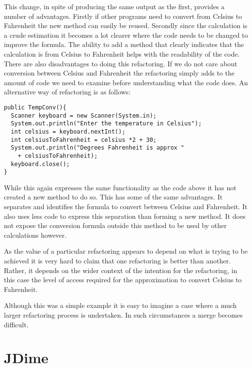 This change, in spite of producing the same output as the first, provides a number of advantages. Firstly if other programs need to convert from Celsius to Fahrenheit the new method can easily be reused. Secondly since the calculation is a crude estimation it becomes a lot clearer where the code needs to be changed to improve the formula. The ability to add a method that clearly indicates that the calculation is from Celsius to Fahrenheit helps with the readability of the code. There are also disadvantages to doing this refactoring. If we do not care about conversion between Celsius and Fahrenheit the refactoring simply adds to the amount of code we need to examine before understanding what the code does. An alternative way of refactoring is as follows:

\begin{minipage}[t]{1.0\textwidth}
\begin{lstlisting}
public TempConv(){
  Scanner keyboard = new Scanner(System.in);
  System.out.println("Enter the temperature in Celsius");
  int celsius = keyboard.nextInt();
  int celsiusToFahrenheit = celsius *2 + 30;
  System.out.println("Degrees Fahrenheit is approx " 
    + celsiusToFahrenheit);
  keyboard.close();
}
\end{lstlisting}
\end{minipage}

While this again expresses the same functionality as the code above it has not created a new method to do so. This has some of the same advantages. It separates and identifies the formula to convert between Celsius and Fahrenheit. It also uses less code to express this separation than forming a new method. It does not expose the conversion formula outside this method to be used by other calculations however.

As the value of a particular refactoring appears to depend on what is trying to be achieved it is very hard to claim that one refactoring is better than another. Rather, it depends on the wider context of the intention for the refactoring, in this case the level of access required for the approximation to convert Celsius to Fahrenheit.

Although this was a simple example it is easy to imagine a case where a much larger refactoring process is undertaken. In such circumstances a merge becomes difficult. 

\section{JDime}

